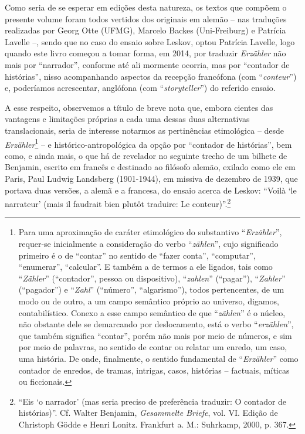 Como seria de se esperar em edições desta natureza, os textos que
compõem o presente volume foram todos vertidos dos originais em alemão
-- nas traduções realizadas por Georg Otte (UFMG), Marcelo Backes
(Uni-Freiburg) e Patrícia Lavelle --, sendo que no caso do ensaio sobre
Leskov, optou Patrícia Lavelle, logo quando este livro começou a tomar
forma, em 2014, por traduzir \emph{Erzähler} não mais por ``narrador'',
conforme até ali mormente ocorria, mas por ``contador de histórias'',
nisso acompanhando aspectos da recepção francófona (com
``\emph{conteur}'') e, poderíamos acrescentar, anglófona (com
``\emph{storyteller}'') do referido ensaio.

A esse respeito, observemos a título de breve nota que, embora cientes
das vantagens e limitações próprias a cada uma dessas duas alternativas
translacionais, seria de interesse notarmos as pertinências etimológica
-- desde \emph{Erzähler}\footnote{Para uma aproximação de caráter
  etimológico do substantivo ``\emph{Erzähler}'', requer-se inicialmente
  a consideração do verbo ``\emph{zählen}'', cujo significado primeiro é
  o de ``contar'' no sentido de ``fazer conta'', ``computar'',
  ``enumerar'', ``calcular''. E também a de termos a ele ligados, tais
  como ``\emph{Zähler}'' (``contador'', pessoa ou dispositivo),
  ``\emph{zahlen}'' (``pagar''), ``\emph{Zahler}'' (``pagador'') e
  ``\emph{Zahl}'' (``número'', ``algarismo''), todos pertencentes, de um
  modo ou de outro, a um campo semântico próprio ao universo, digamos,
  contabilístico. Conexo a esse campo semântico de que ``\emph{zählen}''
  é o núcleo, não obstante dele se demarcando por deslocamento, está o
  verbo ``\emph{erzählen}'', que também significa ``contar'', porém não
  mais por meio de números, e sim por meio de palavras, no sentido de
  contar ou relatar um enredo, um caso, uma história. De onde,
  finalmente, o sentido fundamental de ``\emph{Erzähler}'' como contador
  de enredos, de tramas, intrigas, casos, histórias -- factuais, míticas
  ou ficcionais.} -- e histórico-antropológica da opção por ``contador
de histórias'', bem como, e ainda mais, o que há de revelador no
seguinte trecho de um bilhete de Benjamin, escrito em francês e
destinado ao filósofo alemão, exilado como ele em Paris, Paul Ludwig
Landsberg (1901-1944), em missiva de dezembro de 1939, que portava duas
versões, a alemã e a francesa, do ensaio acerca de Leskov: ``Voilà `le
narrateur' (mais il faudrait bien plutôt traduire: Le
conteur)''.\footnote{``Eis `o narrador' (mas seria preciso de
  preferência traduzir: O contador de histórias)''. Cf. Walter Benjamin,
  \emph{Gesammelte Briefe}, vol. VI. Edição de Christoph Gödde e Henri
  Lonitz. Frankfurt a. M.: Suhrkamp, 2000, p. 367.}


